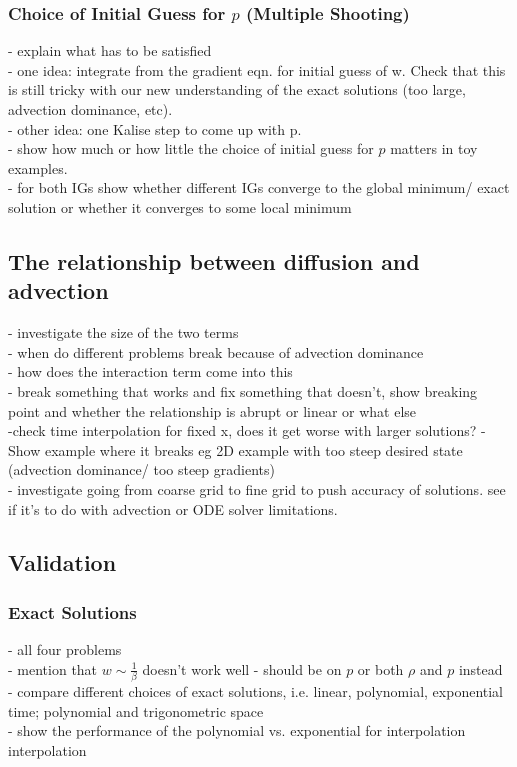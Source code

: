 \documentclass[11pt, a4paper]{article}
\theoremstyle{definition}
\begin{document}
\subsubsection{Choice of Initial Guess for $p$ (Multiple Shooting)}
- explain what has to be satisfied\\
- one idea: integrate from the gradient eqn. for initial guess of w. Check that this is still tricky with our new understanding of the exact solutions (too large, advection dominance, etc). \\
- other idea: one Kalise step to come up with p.\\
- show how much or how little the choice of initial guess for $p$ matters in toy examples.\\
- for both IGs show whether different IGs converge to the global minimum/ exact solution or whether it converges to some local minimum
\subsection{The relationship between diffusion and advection}
- investigate the size of the two terms \\
- when do different problems break because of advection dominance\\
- how does the interaction term come into this\\
- break something that works and fix something that doesn't, show breaking point and whether the relationship is abrupt or linear or what else\\
-check time interpolation for fixed x, does it get worse with larger solutions?
- Show example where it breaks eg 2D example with too steep desired state (advection dominance/ too steep gradients)\\
- investigate going from coarse grid to fine grid to push accuracy of solutions. see if it's to do with advection or ODE solver limitations.
\subsection{Validation}

\subsubsection{Exact Solutions}
- all four problems \\
- mention that $w \sim \frac{1}{\beta}$ doesn't work well - should be on $p$ or both $\rho$ and $p$ instead \\
- compare different choices of exact solutions, i.e. linear, polynomial, exponential time; polynomial and trigonometric space \\
- show the performance of the polynomial vs. exponential for interpolation interpolation \\
\end{document}
